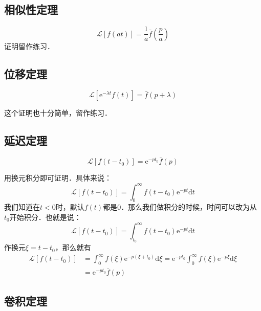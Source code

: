 \subsection{相似性定理}
\begin{equation}
\mathscr{L}[f(at)]=\frac{1}{a} \bar{f}\left(\frac{p}{a}\right)
\end{equation}
证明留作练习．

\subsection{位移定理}
\begin{equation}
\mathscr{L}[\mathrm{e}^{-\lambda t} f(t)]= \bar{f}(p+\lambda)
\end{equation}

这个证明也十分简单，留作练习．

\subsection{延迟定理}
\begin{equation}
\mathscr{L}\left [f\left(t-t_{0}\right)\right] =\mathrm{e}^{-p t_{0}} \bar f(p)
\end{equation}

用换元积分即可证明．具体来说：
\begin{equation}
\mathscr L\left [f\left(t-t_{0}\right)\right] =\int_{0}^{\infty} f\left(t-t_{0}\right) \mathrm{e}^{-p t} \mathrm{d} t
\end{equation}
我们知道在$t<0$时，默认$f(t)$都是$0$．那么我们做积分的时候，时间可以改为从$t_0$开始积分．也就是说：
\begin{equation}
\mathscr L\left [f\left(t-t_{0}\right)\right] =\int_{t_0}^{\infty} f\left(t-t_{0}\right) \mathrm{e}^{-p t} \mathrm{d} t
\end{equation}
作换元$\xi=t-t_0$，那么就有
\begin{equation}
\begin{aligned} \mathscr L\left[f\left(t-t_{0}\right)\right] &=\int_{0}^{\infty} f(\xi) \mathrm{e}^{-p\left(\xi+t_{0}\right)} \mathrm{d} \xi=\mathrm{e}^{-p t_{0}} \int_{0}^{\infty} f(\xi) \mathrm{e}^{-p \xi} \mathrm{d} \xi \\ &=\mathrm{e}^{-p t_{0}} \bar{f}(p) \end{aligned}
\end{equation}

\subsection{卷积定理}

